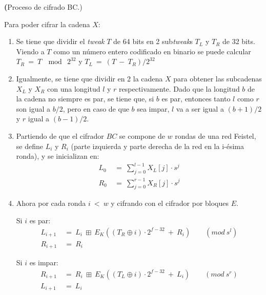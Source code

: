
\textbf(Proceso de cifrado BC.)

Para poder cifrar la cadena $X$:

\begin{enumerate}

  \item Se tiene que dividir el \textit{tweak} $T$ de 64 bits en 2
    sub\textit{tweak}s $T_L$ y $T_R$ de 32 bits. Viendo a $T$ como un número
    entero codificado en binario se puede calcular $T_R\: =\: T\: \mod\: 2^{32}$
    y $T_L\: =\: (T\: -\: T_R) / 2^{32}$

  \item Igualmente, se tiene que dividir en 2 la cadena $X$ para obtener las
    subcadenas $X_L$ y $X_R$ con una longitud $l$ y $r$ respectivamente.
    Dado que la longitud $b$ de la cadena no siempre es par, se tiene que, si
    $b$ es par, entonces tanto $l$ como $r$ son igual a $b/2$, pero en caso
    de que $b$ sea impar, $l$ va a ser igual a $(b+1)/2$ y $r$ igual a
    $(b-1)/2$.

  \item Partiendo de que el cifrador $BC$ se compone de $w$ rondas de una red
    Feistel, se define $L_i$ y $R_i$ (parte izquierda y parte derecha de la
    red en la i-ésima ronda), y se inicializan en:
    \begin{align}
      L_0\: &=\: \sum_{j=0}^{l-1} X_L[j] \cdot s^j \\
      R_0\: &=\: \sum_{j=0}^{r-1} X_R[j] \cdot s^j
    \end{align}

  \item Ahora por cada ronda $i\: <\: w$ y cifrando con el cifrador por
    bloques $E$.

    Si $i$ es par:
    \begin{align}
      L_{i+1}\: &=\: L_i\: \boxplus\:
                    E_K((T_R \oplus i) \cdot 2^{f-32}\: +\: R_i)\qquad
                    (mod\ s^l) \\
      R_{i+1}\: &=\: R_i
    \end{align}

    Si $i$ es impar:
    \begin{align}
      R_{i+1}\: &=\: R_i\: \boxplus\:
                    E_K((T_L \oplus i) \cdot 2^{f-32}\: +\: L_i)\qquad
                    (mod\ s^r) \\
      L_{i+1}\: &=\: L_i
    \end{align}


\end{enumerate}
